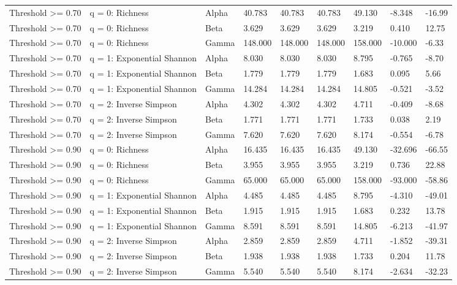 \begin{landscape}
\begin{longtable}{L{3.4cm}L{2.5cm}L{1.6cm}*{6}{C{1.55cm}}}
Threshold >= 0.70 & q = 0: Richness & Alpha & 40.783 & 40.783 & 40.783 & 49.130 & -8.348 & -16.99 \\
Threshold >= 0.70 & q = 0: Richness & Beta & 3.629 & 3.629 & 3.629 & 3.219 & 0.410 & 12.75 \\
Threshold >= 0.70 & q = 0: Richness & Gamma & 148.000 & 148.000 & 148.000 & 158.000 & -10.000 & -6.33 \\
Threshold >= 0.70 & q = 1: Exponential Shannon & Alpha & 8.030 & 8.030 & 8.030 & 8.795 & -0.765 & -8.70 \\
Threshold >= 0.70 & q = 1: Exponential Shannon & Beta & 1.779 & 1.779 & 1.779 & 1.683 & 0.095 & 5.66 \\
Threshold >= 0.70 & q = 1: Exponential Shannon & Gamma & 14.284 & 14.284 & 14.284 & 14.805 & -0.521 & -3.52 \\
Threshold >= 0.70 & q = 2: Inverse Simpson & Alpha & 4.302 & 4.302 & 4.302 & 4.711 & -0.409 & -8.68 \\
Threshold >= 0.70 & q = 2: Inverse Simpson & Beta & 1.771 & 1.771 & 1.771 & 1.733 & 0.038 & 2.19 \\
Threshold >= 0.70 & q = 2: Inverse Simpson & Gamma & 7.620 & 7.620 & 7.620 & 8.174 & -0.554 & -6.78 \\
Threshold >= 0.90 & q = 0: Richness & Alpha & 16.435 & 16.435 & 16.435 & 49.130 & -32.696 & -66.55 \\
Threshold >= 0.90 & q = 0: Richness & Beta & 3.955 & 3.955 & 3.955 & 3.219 & 0.736 & 22.88 \\
Threshold >= 0.90 & q = 0: Richness & Gamma & 65.000 & 65.000 & 65.000 & 158.000 & -93.000 & -58.86 \\
Threshold >= 0.90 & q = 1: Exponential Shannon & Alpha & 4.485 & 4.485 & 4.485 & 8.795 & -4.310 & -49.01 \\
Threshold >= 0.90 & q = 1: Exponential Shannon & Beta & 1.915 & 1.915 & 1.915 & 1.683 & 0.232 & 13.78 \\
Threshold >= 0.90 & q = 1: Exponential Shannon & Gamma & 8.591 & 8.591 & 8.591 & 14.805 & -6.213 & -41.97 \\
Threshold >= 0.90 & q = 2: Inverse Simpson & Alpha & 2.859 & 2.859 & 2.859 & 4.711 & -1.852 & -39.31 \\
Threshold >= 0.90 & q = 2: Inverse Simpson & Beta & 1.938 & 1.938 & 1.938 & 1.733 & 0.204 & 11.78 \\
Threshold >= 0.90 & q = 2: Inverse Simpson & Gamma & 5.540 & 5.540 & 5.540 & 8.174 & -2.634 & -32.23 \\
\end{longtable}
\end{landscape}
